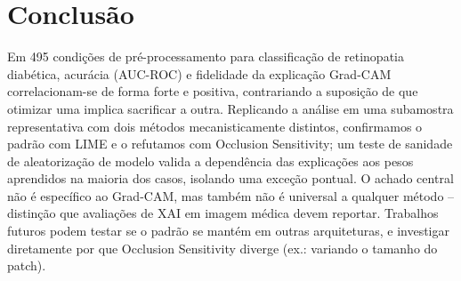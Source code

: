 \documentclass[12pt]{article}
\begin{document}
\section{Conclusão}

Em 495 condições de pré-processamento para classificação de retinopatia
diabética, acurácia (AUC-ROC) e fidelidade da explicação Grad-CAM
correlacionam-se de forma forte e positiva, contrariando a suposição de que
otimizar uma implica sacrificar a outra. Replicando a análise em uma
subamostra representativa com dois métodos mecanisticamente distintos,
confirmamos o padrão com LIME e o refutamos com Occlusion Sensitivity; um
teste de sanidade de aleatorização de modelo valida a dependência das
explicações aos pesos aprendidos na maioria dos casos, isolando uma exceção
pontual. O achado central não é específico ao Grad-CAM, mas também não é
universal a qualquer método -- distinção que avaliações de XAI em imagem
médica devem reportar. Trabalhos futuros podem testar se o padrão se
mantém em outras arquiteturas, e investigar diretamente por que Occlusion
Sensitivity diverge (ex.: variando o tamanho do patch).
\end{document}
